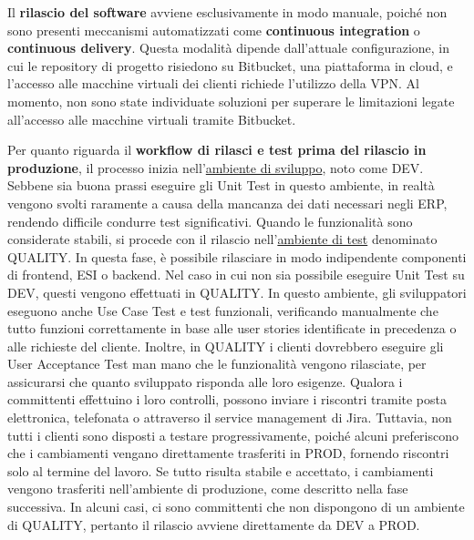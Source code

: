         Il \textbf{rilascio del software} avviene esclusivamente in modo manuale, poiché non sono presenti meccanismi automatizzati come \textbf{continuous integration}
        o \textbf{continuous delivery}. Questa modalità dipende dall'attuale configurazione, in cui le repository di progetto risiedono su Bitbucket, una piattaforma
        in cloud, e l’accesso alle macchine virtuali dei clienti richiede l’utilizzo della VPN. Al momento, non sono state individuate soluzioni per superare le limitazioni
        legate all'accesso alle macchine virtuali tramite Bitbucket.

        Per quanto riguarda il \textbf{workflow di rilasci e test prima del rilascio in produzione}, il processo inizia nell'\underline{ambiente di sviluppo}, noto come DEV.
        Sebbene sia buona prassi eseguire gli Unit Test in questo ambiente, in realtà vengono svolti raramente a causa della mancanza dei dati necessari negli \ac{ERP},
        rendendo difficile condurre test significativi. Quando le funzionalità sono considerate stabili, si procede con il rilascio nell'\underline{ambiente di test} denominato
        QUALITY. In questa fase, è possibile rilasciare in modo indipendente componenti di frontend, \ac{ESI} o backend. Nel caso in cui non sia possibile eseguire Unit
        Test su DEV, questi vengono effettuati in QUALITY. In questo ambiente, gli sviluppatori eseguono anche Use Case
        Test e test funzionali, verificando manualmente che tutto funzioni correttamente in base alle user stories identificate in precedenza o alle richieste del cliente.
        Inoltre, in QUALITY i clienti dovrebbero eseguire gli User Acceptance Test man mano che le funzionalità vengono rilasciate, per assicurarsi che quanto sviluppato
        risponda alle loro esigenze. Qualora i committenti effettuino i loro controlli, possono inviare i riscontri tramite posta elettronica, telefonata o attraverso il service
        management di Jira. Tuttavia, non tutti i clienti sono disposti a testare progressivamente, poiché alcuni preferiscono che i cambiamenti vengano direttamente
        trasferiti in PROD, fornendo riscontri solo al termine del lavoro. Se tutto risulta stabile e accettato, i cambiamenti vengono trasferiti nell'ambiente di produzione,
        come descritto nella fase successiva. In alcuni casi, ci sono
        committenti che non dispongono di un ambiente di QUALITY, pertanto il rilascio avviene direttamente da DEV a PROD.

